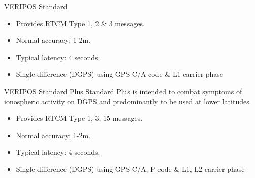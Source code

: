 \documentclass[12pt]{beamer}
\begin{document}
\begin{frame}{VERIPOS Standard}
	
	\begin{itemize}	
	\item Provides RTCM Type 1, 2 \& 3 messages.
	\item Normal accuracy: 1-2m. 
	\item Typical latency: 4 seconds.
	\item Single difference (DGPS) using GPS C/A code \& L1 carrier phase
	\end{itemize}	
	
\end{frame}

\begin{frame}{VERIPOS Standard Plus}
	Standard Plus is intended to combat symptoms of ionospheric activity on DGPS and predominantly to be used at lower latitudes. 
	\begin{itemize}	
		\item Provides RTCM Type 1, 3, 15 messages.
		\item Normal accuracy: 1-2m. 
		\item Typical latency: 4 seconds.
		\item Single difference (DGPS) using GPS C/A, P code \& L1, L2 carrier phase
	\end{itemize}	
\end{frame}	
\end{document}
